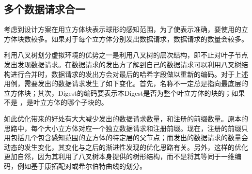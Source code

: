 \subsection{多个数据请求合一}
\label{MultiLevelOptimizationSection}
\par
考虑到设计方案在用立方体块表示球形的感知范围，为了使表示准确，要使用的立方体块数较多。如果对于每个立方体分别发出数据请求，数据请求的数量会较多。
\par
利用八叉树划分虚拟环境的优势之一是利用八叉树的层次结构，即不止对叶子节点发出发现数据请求。在数据请求的发出方了解到自己的数据请求可以利用八叉树结构进行合并时，数据请求的发出方会对最后的哈希字段做以重新的编码。对于上述用例，需要发出的数据请求发生了如下变化。首先，名称不一定总是指向最底层的立方体块；其次，Digest的编码要表示本Digest是否为整个叶立方体的块的；如果不是 ，是叶立方体的哪个子块的。
\par
如此优化带来的好处有大大减少发出的数据请求数量，和注册的前缀数量。原本的思路中，每个大小立方体对应一个独立数据请求和注册前缀。现在，注册的前缀只用包括几个包含感知范围的立方体的特定层的父节点；而发出的数据请求的数量会动态的发生变化，其变化与之后的渐进性发现的优化思路有关。另外，这样的优化更加自然，因为其利用了八叉树本身提供的树形结构，而不是将其等同于一维编码，例如基于康拓配对或希尔伯特曲线的划分。
\par
